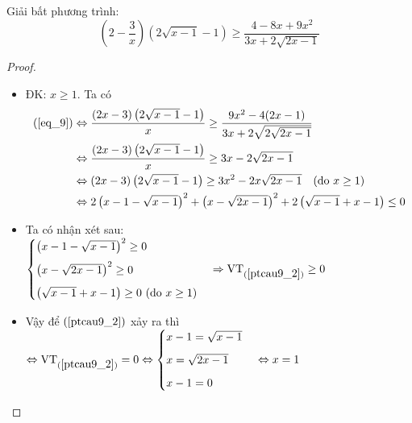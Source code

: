 \begin{dl}
	Giải bất phương trình: \begin{equation}\label{eq_9}
	\left(2-\dfrac{3}{x}\right)\left(2\sqrt{x-1}-1\right) \geq \dfrac{4-8x+9x^2}{3x+2\sqrt{2x-1}}
	\end{equation}
\end{dl}
\begin{proof}~
	\begin{itemize}
	\item  ĐK: $x\geq 1$. Ta có
	\begin{align}
		(\ref{eq_9})&\Leftrightarrow \frac{(2x-3)\left(2\sqrt{x-1}-1\right)}{x}\geq \frac{9x^2-4(2x-1)}{3x+2\sqrt{2\sqrt{2x-1}}}\nonumber\\
		&\Leftrightarrow \frac{(2x-3)\left(2\sqrt{x-1}-1\right)}{x}\geq 3x-2\sqrt{2x-1}\nonumber\\
		&\Leftrightarrow (2x-3)\left(2\sqrt{x-1}-1\right)\geq 3x^2-2x\sqrt{2x-1} \quad(\mbox{do }x\geq 1)\nonumber\\
		&\Leftrightarrow 2\left(x-1-\sqrt{x-1}\right)^2+\left(x-\sqrt{2x-1}\right)^2+2\left(\sqrt{x-1}+x-1\right)\leq 0\label{ptcau9_2}
	\end{align}
	\item Ta có nhận xét sau: $\begin{cases}
	\left(x-1-\sqrt{x-1}\right)^2\geq 0\\[6pt]
	\left(x-\sqrt{2x-1}\right)^2\geq 0\\[6pt]
	\left(\sqrt{x-1}+x-1\right)\geq 0 \mbox{ (do } x\geq 1)
	\end{cases}\Rightarrow \mbox{VT}_{(\ref{ptcau9_2})}\geq 0$
	\item Vậy để $(\ref{ptcau9_2})$ xảy ra thì $\Leftrightarrow \mbox{VT}_{(\ref{ptcau9_2})}=0\Leftrightarrow
	\begin{cases}
	x-1=\sqrt{x-1}\\[6pt]
	x=\sqrt{2x-1}\\[6pt]
	x-1=0
	\end{cases}\Leftrightarrow x=1$
	\end{itemize}
\end{proof}

